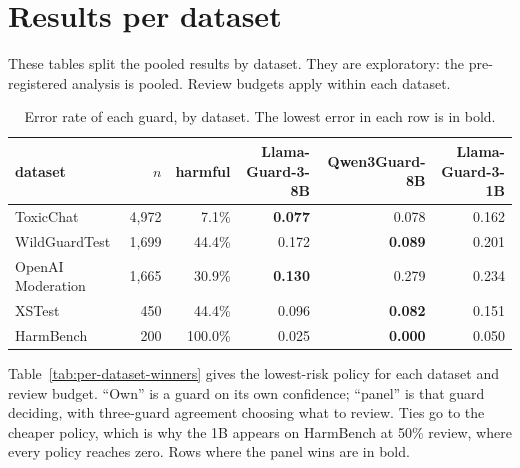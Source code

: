 \documentclass[11pt]{article}
\begin{document}



\clearpage
\appendix
\FloatBarrier

\section{Results per dataset}
\label{app:per-dataset}

These tables split the pooled results by dataset. They are exploratory: the pre-registered analysis is pooled. Review budgets apply within each dataset.

\begin{table}[ht]
\centering
\small
\caption{Error rate of each guard, by dataset. The lowest error in each row is in bold.}
\label{tab:per-dataset-error}
\begin{tabular}{lrrrrr}
\toprule
dataset & $n$ & harmful & Llama-Guard-3-8B & Qwen3Guard-8B & Llama-Guard-3-1B \\
\midrule
ToxicChat & 4,972 & 7.1\% & \textbf{0.077} & 0.078 & 0.162 \\
WildGuardTest & 1,699 & 44.4\% & 0.172 & \textbf{0.089} & 0.201 \\
OpenAI Moderation & 1,665 & 30.9\% & \textbf{0.130} & 0.279 & 0.234 \\
XSTest & 450 & 44.4\% & 0.096 & \textbf{0.082} & 0.151 \\
HarmBench & 200 & 100.0\% & 0.025 & \textbf{0.000} & 0.050 \\
\bottomrule
\end{tabular}
\end{table}

Table~\ref{tab:per-dataset-winners} gives the lowest-risk policy for each dataset and review budget. ``Own'' is a guard on its own confidence; ``panel'' is that guard deciding, with three-guard agreement choosing what to review. Ties go to the cheaper policy, which is why the 1B appears on HarmBench at 50\% review, where every policy reaches zero. Rows where the panel wins are in bold.
\end{document}
